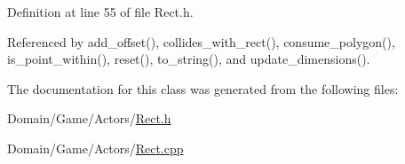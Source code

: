 Definition at line 55 of file Rect.\+h.



Referenced by add\+\_\+offset(), collides\+\_\+with\+\_\+rect(), consume\+\_\+polygon(), is\+\_\+point\+\_\+within(), reset(), to\+\_\+string(), and update\+\_\+dimensions().



The documentation for this class was generated from the following files\+:\begin{DoxyCompactItemize}
\item 
Domain/\+Game/\+Actors/\hyperlink{Rect_8h}{Rect.\+h}\item 
Domain/\+Game/\+Actors/\hyperlink{Rect_8cpp}{Rect.\+cpp}\end{DoxyCompactItemize}
